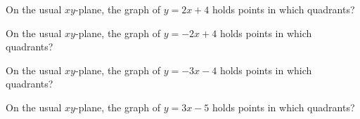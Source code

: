 \documentclass{ximera}
\author{Lee Wayand}
\begin{document}
\begin{exercise}





\begin{question} 


On the usual $xy$-plane, the graph of $y = 2x + 4$ holds points in which quadrants?
\begin{selectAll}
\end{selectAll}

\end{question}









\begin{question} 


On the usual $xy$-plane, the graph of $y = -2x + 4$ holds points in which quadrants?
\begin{selectAll}
\end{selectAll}

\end{question}












\begin{question} 


On the usual $xy$-plane, the graph of $y = -3x - 4$ holds points in which quadrants?
\begin{selectAll}
\end{selectAll}

\end{question}









\begin{question} 


On the usual $xy$-plane, the graph of $y = 3x - 5$ holds points in which quadrants?
\begin{selectAll}
\end{selectAll}


\end{question}
\end{exercise}
\end{document}
